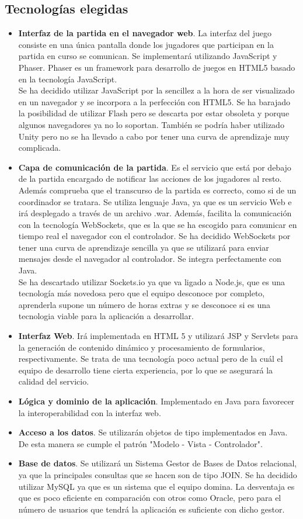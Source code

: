 \subsection{Tecnologías elegidas}
\begin{itemize}
\item \textbf{Interfaz de la partida en el navegador web}. La interfaz del juego consiste en una única pantalla donde los jugadores que participan en la partida en curso se comunican. Se implementará utilizando JavaScript y Phaser. Phaser es un framework para desarrollo de juegos en HTML5 basado en la tecnología JavaScript.  \\ Se ha decidido utilizar JavaScript por la sencillez a la hora de ser visualizado en un navegador y se incorpora a la perfección con HTML5. Se ha barajado la posibilidad de utilizar Flash pero se descarta por estar obsoleta y porque algunos navegadores ya no lo soportan. También se podría haber utilizado Unity pero no se ha llevado a cabo por tener una curva de aprendizaje muy complicada.
\item \textbf{Capa de comunicación de la partida}. Es el servicio que está por debajo de la partida encargado de notificar las acciones de los jugadores al resto. Además comprueba que el transcurso de la partida es correcto, como si de un coordinador se tratara. Se utiliza lenguaje Java, ya que es un servicio Web e irá desplegado a través de un archivo .war. Además, facilita la comunicación con la tecnología WebSockets, que es la que se ha escogido para comunicar en tiempo real el navegador con el controlador. Se ha decidido WebSockets por tener una curva de aprendizaje sencilla ya que se utilizará para enviar mensajes desde el navegador al controlador. Se integra perfectamente con Java. \\
Se ha descartado utilizar Sockets.io ya que va ligado a Node.js, que es una tecnología más novedosa pero que el equipo desconoce por completo, aprenderla supone un número de horas extras y se desconoce si es una tecnologia viable para la aplicación a desarrollar.
\item \textbf{Interfaz Web}. Irá implementada en HTML 5 y utilizará JSP y Servlets para la generación de contenido dinámico y procesamiento de formularios, respectivamente. Se trata de una tecnología poco actual pero de la cuál el equipo de desarrollo tiene cierta experiencia, por lo que se asegurará la calidad del servicio.
\item \textbf{Lógica y dominio de la aplicación}. Implementado en Java para favorecer la interoperabilidad con la interfaz web.
\item \textbf{Acceso a los datos}. Se utilizarán objetos de tipo implementados en Java. De esta manera se cumple el patrón "Modelo - Vista - Controlador".
\item \textbf{Base de datos}. Se utilizará un Sistema Gestor de Bases de Datos relacional, ya que la principales consultas que se hacen son de tipo JOIN. Se ha decidido utilizar MySQL ya que es un sistema que el equipo domina. La desventaja es que es poco eficiente en comparación con otros como Oracle, pero para el número de usuarios que tendrá la aplicación es suficiente con dicho gestor.
\end{itemize}

